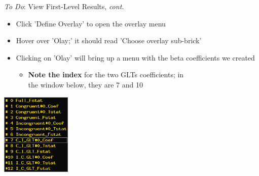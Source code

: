 \documentclass[t,12pt]{beamer}
\begin{document}
\begin{frame}{\emph{To Do}: View First-Level Results, \textit{cont.}}
\vspace{10pt}
\begin{itemize}
\setlength\itemsep{1em}
\item Click 'Define Overlay' to open the overlay menu
\item Hover over 'Olay;' it should read 'Choose overlay sub-brick' 
\item Clicking on 'Olay' will bring up a menu with the beta coefficients we created
\vspace{4pt}
\begin{itemize}
\setlength\itemsep{0.5em}
\item \textbf{Note the index} for the two GLTs \textbeta{} coefficients; in \\ the window below, they are 7 and 10
\end{itemize}
\end{itemize}
\vspace{4pt}
\centering
\includegraphics[width=0.25\textwidth]{images/olay.png}
\end{frame}
\end{document}
